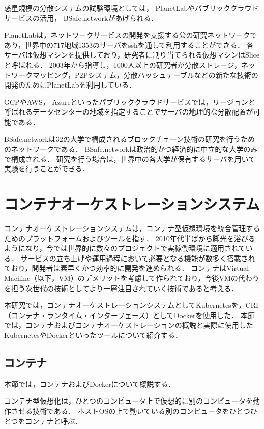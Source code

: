 惑星規模の分散システムの試験環境としては， PlanetLabやパブリッククラウドサービスの活用， BSafe.networkがあげられる．

PlanetLabは，ネットワークサービスの開発を支援する公の研究ネットワークであり，世界中の717地域1353のサーバをsshを通して利用することができる．
各サーバは仮想マシンを提供しており，研究者に割り当てられる仮想マシンはSliceと呼ばれる．
2003年から指導し，1000人以上の研究者が分散ストレージ，ネットワークマッピング，P2Pシステム，分散ハッシュテーブルなどの新たな技術の開発のためにPlanetLabを利用している．

GCPやAWS， Azureといったパブリッククラウドサービスでは，リージョンと呼ばれるデータセンターの地域を指定することでサーバの地理的な分散配置が可能である．

BSafe.networkは32の大学で構成されるブロックチェーン技術の研究を行うためのネットワークである．
BSafe.networkは政治的かつ経済的に中立的な大学のみで構成される．
研究を行う場合は，世界中の各大学が保有するサーバを用いて実験を行うことができる．

\section{コンテナオーケストレーションシステム}
\label{background:container-orchestration-system}

コンテナオーケストレーションシステムは，コンテナ型仮想環境を統合管理するためのプラットフォームおよびツールを指す．
2010年代半ばから脚光を浴びるようになり，今では世界的に数々のプロジェクトで実稼働環境に適用されている．
サービスの立ち上げや運用過程において必要となる機能が数多く搭載されており，開発者は素早くかつ効率的に開発を進められる．
コンテナはVirtual Machine（以下，VM）のデメリットを考慮して作られており，今後VMの代わりを担う次世代の技術としてより一層注目されていく技術であると考える．

本研究では，コンテナオーケストレーションシステムとしてKubernetesを，CRI（コンテナ・ランタイム・インターフェース）としてDockerを使用した．
本節では，コンテナおよびコンテナオーケストレーションの概説と実際に使用したKubernetesやDockerといったツールについて紹介する．

\subsection{コンテナ}
\label{background:container-orchestration-system:container}

本節では，コンテナおよびDockerについて概説する．

コンテナ型仮想化は，ひとつのコンピュータ上で仮想的に別のコンピュータを動作させる技術である．
ホストOSの上で動いている別のコンピュータをひとつひとつをコンテナと呼ぶ．

